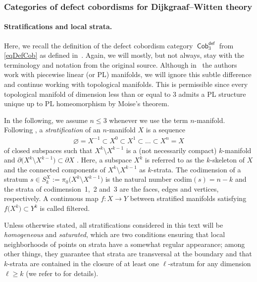 \documentclass[pdftex]{sigma}
\DeclareMathOperator{\Cob}{\mathsf{Cob}}
\numberwithin{equation}{section}
\theoremstyle{definition}
\begin{document}
\subsubsection{Categories of defect cobordisms for Dijkgraaf--Witten theory}
\label{subSubSecDWCob}
\paragraph{Stratifications and local strata.}
Here, we recall the definition of the defect cobordism category $\Cob_3^{\mathsf{def}}$ from \eqref{eqDefCob} as defined in~\cite{FMM}. Again, we will mostly, but not always, stay with the terminology and notation from the original source. Although in~\cite{FMM} the authors work with piecewise linear (or PL) manifolds, we will ignore this subtle difference and continue working with topological manifolds. This is permissible since every topological manifold of dimension less than or equal to 3 admits a PL structure unique up to PL homeomorphism by Moise's theorem.

In the following, we assume $n \leq 3$ whenever we use the term $n$-manifold. Following \cite[Section~3.2]{FMM}, a \textit{stratification} of an $n$-manifold $X$ is a sequence
\begin{align*}
 \varnothing = X^{-1} \subset X^0 \subset X^1 \subset \dots \subset X^n = X
\end{align*}
of closed subspaces such that $X^k \setminus X^{k-1}$ is a (not necessarily compact) $k$-manifold and $ \partial \bigl(X^k \setminus X^{k-1}\bigr) \subset \partial X$ \cite[Definition~3.6]{FMM}. Here, a subspace $X^k$ is referred to as the $k$-skeleton of $X$ and the connected components of $X^k \setminus X^{k-1}$ as $k$-strata. The codimension of a stratum $s \in S_k^X := \pi_0\bigl(X^k \setminus X^{k-1}\bigr)$ is the natural number $\mathrm{codim}(s) = n-k$ and the strata of codimension~1,~2 and~3 are the faces, edges and vertices, respectively. A continuous map $f\colon X \rightarrow Y$ between stratified manifolds satisfying $f\bigl(X^k\bigr) \subset Y^k$ is called filtered.

Unless otherwise stated, all stratifications considered in this text will be \textit{homogeneous} and \textit{saturated}, which are two conditions ensuring that local neighborhoods of points on strata have a somewhat regular appearance; among other things, they guarantee that strata are transversal at the boundary and that $k$-strata are contained in the closure of at least one $\ell$-stratum for any dimension $\ell \geq k$ (we refer to \cite[Definition~3.7]{FMM} for details).
\end{document}
